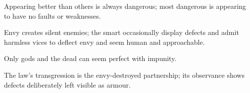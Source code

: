 

\begin{distilled}
  \item Appearing better than others is always dangerous; most dangerous is appearing to have no faults or weaknesses.
  \item Envy creates silent enemies; the smart occasionally display defects and admit harmless vices to deflect envy and seem human and approachable.
  \item Only gods and the dead can seem perfect with impunity.
  \item The law's transgression is the envy-destroyed partnership; its observance shows defects deliberately left visible as armour.
\end{distilled}
